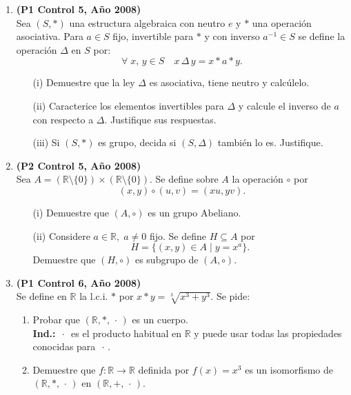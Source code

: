 \documentclass[11pt]{article}
\newcommand{\R}{\mathbb R}
\theoremstyle{plain}
\theoremstyle{definition}
\begin{document}
\begin{enumerate}
\item \textbf{(P1 Control 5, Año 2008)}\\
Sea $(S,*)$ una estructura algebraica con neutro $e$ y $*$ una operación asociativa. Para $a\in S$ fijo, invertible para $*$ y con inverso $a^{-1}\in S$ se define la operación $\Delta$ en $S$ por:
$$\forall\;x,\,y\in S\quad x\,\Delta\,y=x*a*y.$$
\begin{enumerate}
\item[(i)] Demuestre que la ley $\Delta$ es asociativa, tiene neutro y calcúlelo.
\item[(ii)] Caracterice los elementos invertibles para $\Delta$ y calcule el inverso de $a$ con respecto a $\Delta$. Justifique sus respuestas.
\item[(iii)] Si $(S,*)$ es grupo, decida si $(S,\Delta)$ también lo es. Justifique.
\end{enumerate}

\item \textbf{(P2 Control 5, Año 2008)}\\
Sea $A=(\R\setminus\{0\})\times (\R\setminus\{0\})$. Se define sobre $A$ la operación $\circ$ por
$$(x,y)\circ (u,v)=(xu,yv).$$
\begin{enumerate}
\item[(i)] Demuestre que $(A,\circ)$ es un grupo Abeliano.
\item[(ii)] Considere $a\in\R,\; a\neq 0$ fijo. Se define $H\subseteq A$ por
$$H=\{(x,y)\in A\;|\;y=x^{a}\}.$$
Demuestre que $(H,\circ)$ es subgrupo de $(A,\circ)$.
\end{enumerate}

\item \textbf{(P1 Control 6, Año 2008)}\\
Se define en $\R$ la l.c.i. $*$ por $x*y=\sqrt[3]{x^3+y^3}$. Se pide:
\begin{enumerate}
\item Probar que $(\R,*,\,\cdot\,)$ es un cuerpo.\\
\textbf{Ind.:} $\,\cdot\,$ es el producto habitual en $\R$ y puede usar todas las propiedades conocidas para $\,\cdot\,$.
\item Demuestre que $f:\R\longrightarrow \R$ definida por $f(x)=x^3$ es un isomorfismo de $(\R,*,\,\cdot\,)$ en $(\R,+,\,\cdot\,)$.
\end{enumerate}


\end{enumerate}
\end{document}
